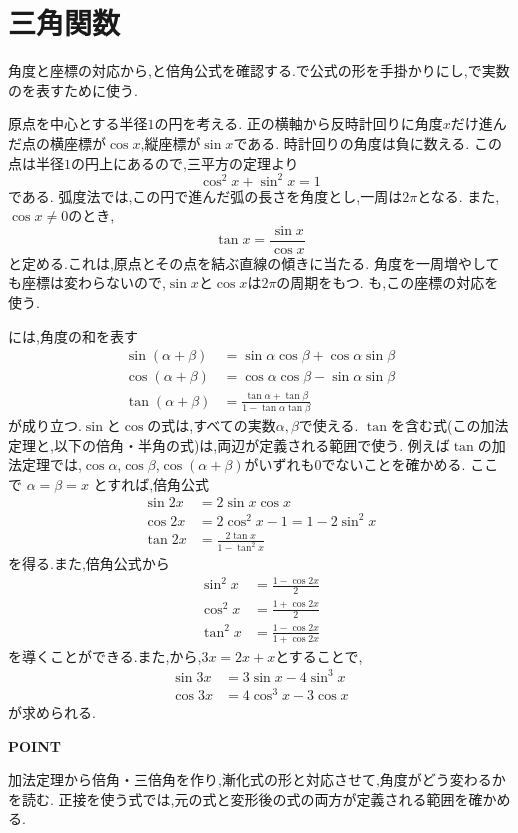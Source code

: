 \section{三角関数}\label{節：三角関数}
角度と座標の対応から,と倍角公式を確認する.で公式の形を手掛かりにし,で実数のを表すために使う.

原点を中心とする半径$1$の円を考える.
正の横軸から反時計回りに角度$x$だけ進んだ点の横座標が$\cos x$,縦座標が$\sin x$である.
時計回りの角度は負に数える.
この点は半径$1$の円上にあるので,三平方の定理より
\[
  \cos^2x+\sin^2x=1
\]
である.
弧度法では,この円で進んだ弧の長さを角度とし,一周は$2\pi$となる.
また,$\cos x\ne0$のとき,
\[
  \tan x=\frac{\sin x}{\cos x}
\]
と定める.これは,原点とその点を結ぶ直線の傾きに当たる.
角度を一周増やしても座標は変わらないので,$\sin x$と$\cos x$は$2\pi$の周期をもつ.
も,この座標の対応を使う.

には,角度の和を表す
\begin{align*}
  \sin(\alpha+\beta)
  &=\sin\alpha\cos\beta+\cos\alpha\sin\beta\\
  \cos(\alpha+\beta)
  &=\cos\alpha\cos\beta-\sin\alpha\sin\beta\\
  \tan(\alpha+\beta)
  &=\frac{\tan\alpha+\tan\beta}
  {1-\tan\alpha\tan\beta}
\end{align*}
が成り立つ.$\sin$と$\cos$の式は,すべての実数$\alpha,\beta$で使える.
$\tan$を含む式(この加法定理と,以下の倍角・半角の式)は,両辺が定義される範囲で使う.
例えば$\tan$の加法定理では,$\cos\alpha$,$\cos\beta$,$\cos(\alpha+\beta)$がいずれも0でないことを確かめる.
ここで $\alpha=\beta=x$ とすれば,倍角公式
\begin{align*}
  \sin 2x&=2\sin x\cos x\\
  \cos 2x&=2\cos^2x-1=1-2\sin^2x\\
  \tan 2x&=\frac{2\tan x}{1-\tan^2x}
\end{align*}
を得る.また,倍角公式から
\begin{align*}
  \sin^2x&=\frac{1-\cos 2x}{2}\\
  \cos^2x&=\frac{1+\cos 2x}{2}\\
  \tan^2x&=\frac{1-\cos 2x}{1+\cos 2x}
\end{align*}
を導くことができる.また,から,$3x=2x+x$とすることで,
\begin{align*}
  \sin 3x&=3\sin x-4\sin^3x\\
  \cos 3x&=4\cos^3x-3\cos x
\end{align*}
が求められる.

\begin{bookpoint}
  \textbf{POINT}\par
  加法定理から倍角・三倍角を作り,漸化式の形と対応させて,角度がどう変わるかを読む.
  正接を使う式では,元の式と変形後の式の両方が定義される範囲を確かめる.
\end{bookpoint}
